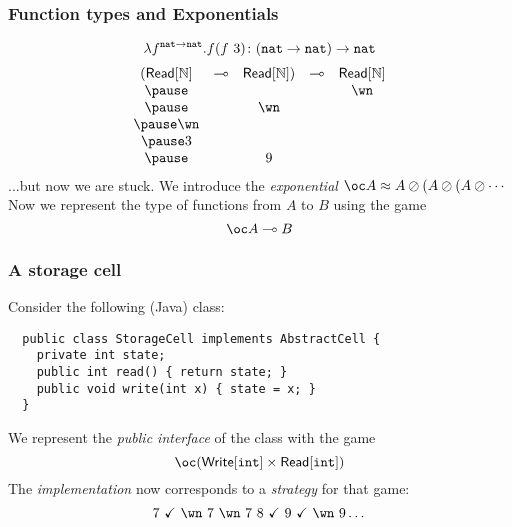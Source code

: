 \documentclass{beamer}
\newcommand{\Read}{{\mathsf{Read}}}
\newcommand{\Write}{{\mathsf{Write}}}
\newcommand{\tick}{\checkmark}
\renewcommand{\int}{\texttt{int}}
\begin{document}
\begin{frame}
  \frametitle{Function types and Exponentials}
  \[
    \lambda f^{{\mathtt{nat}}\to{\mathtt{nat}}}.f(f\ 3)\colon ({\mathtt{nat}}\to{\mathtt{nat}})\to{\mathtt{nat}}
    \]
  \pause
  \[
    \begin{array}{ccccc}
      (\Read[\bN] & \implies & \Read[\bN]) & \implies & \Read[\bN] \\
      \pause
      & & & & \wn \\
      \pause
      & & \wn & & \\
      \pause
      \wn & & & & \\
      \pause
      3 & & & & \\
      \pause
      & & 9 & & \\
    \end{array}
    \]
  \pause
  ...but now we are stuck.
  \pause
  We introduce the \emph{exponential} $\oc A \approx A \sequoid (A \sequoid (A \sequoid \cdots$
  \pause
  Now we represent the type of functions from $A$ to $B$ using the game
  \[
    \oc A \implies B
    \]
\end{frame}

\begin{frame}[fragile]
  \frametitle{A storage cell}
  Consider the following (Java) class:
  \begin{verbatim}
  public class StorageCell implements AbstractCell {
    private int state;
    public int read() { return state; }
    public void write(int x) { state = x; }
  }
  \end{verbatim}
  \pause
  We represent the \emph{public interface} of the class with the game
  \[
    \oc(\Write[\int] \times \Read[\int])
    \]
  \pause
  The \emph{implementation} now corresponds to a \emph{strategy} for that game:
  \[
    7\ \tick\ \wn\ 7\ \wn\ 7\ 8\ \tick\ 9\ \tick\ \wn\ 9\dots
    \]
\end{frame}
\end{document}
